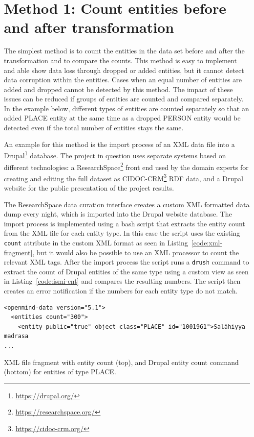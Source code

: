 \documentclass[final]{anthology-ch} %
\begin{document}
\section{Method 1: Count entities before and after transformation}

The simplest method is to count the entities in the data set before and after the transformation and to compare the counts. This method is easy to implement and able show data loss through dropped or added entities, but it cannot detect data corruption within the entities. Cases when an equal number of entities are added and dropped cannot be detected by this method. The impact of these issues can be reduced if groups of entities are counted and compared separately. In the example below, different types of entities are counted separately so that an added PLACE entity at the same time as a dropped PERSON entity would be detected even if the total number of entities stays the same.

An example for this method is the import process of an XML data file into a Drupal\footnote{\url{https://drupal.org/}} database. The project in question uses separate systems based on different technologies: a ResearchSpace\footnote{\url{https://researchspace.org/}} front end used by the domain experts for creating and editing the full dataset as CIDOC-CRM\footnote{\url{https://cidoc-crm.org/}} RDF data, and a Drupal website for the public presentation of the project results.

The ResearchSpace data curation interface creates a custom XML formatted data dump every night, which is imported into the Drupal website database. The import process is implemented using a bash script that extracts the entity count from the XML file for each entity type. In this case the script uses the existing \texttt{count} attribute in the custom XML format as seen in Listing~\ref{code:xml-fragment}, but it would also be possible to use an XML processor to count the relevant XML tags. After the import process the script runs a \texttt{drush} command to extract the count of Drupal entities of the same type using a custom view as seen in Listing~\ref{code:ismi-cnt} and compares the resulting numbers. The script then creates an error notification if the numbers for each entity type do not match.

\begin{listing}
\begin{verbatim}
<openmind-data version="5.1">
  <entities count="300">
    <entity public="true" object-class="PLACE" id="1001961">Salähiyya madrasa
...
\end{verbatim}
 \caption{XML file fragment with entity count (top), and Drupal entity count command (bottom) for entities of type PLACE.}
\label{code:xml-fragment}
\end{listing}
\end{document}

